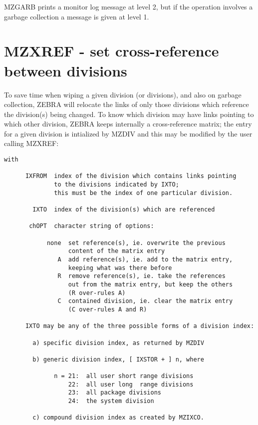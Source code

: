 MZGARB prints a monitor log message at level 2,
but if the operation involves a garbage collection
a message is given at level 1.

\section{MZXREF - set cross-reference between divisions}

To save time when wiping a given division (or divisions),
and also on garbage collection,
ZEBRA will relocate the links of only those divisions
which reference the division(s) being changed.
To know which division may have links pointing
to which other division,
ZEBRA keeps internally a cross-reference matrix;
the entry for a given division is intialized by MZDIV
and this may be modified by the user calling MZXREF:

\begin{verbatim}
with

      IXFROM  index of the division which contains links pointing
              to the divisions indicated by IXTO;
              this must be the index of one particular division.

        IXTO  index of the division(s) which are referenced

       chOPT  character string of options:

            none  set reference(s), ie. overwrite the previous
                  content of the matrix entry
               A  add reference(s), ie. add to the matrix entry,
                  keeping what was there before
               R  remove reference(s), ie. take the references
                  out from the matrix entry, but keep the others
                  (R over-rules A)
               C  contained division, ie. clear the matrix entry
                  (C over-rules A and R)

      IXTO may be any of the three possible forms of a division index:

        a) specific division index, as returned by MZDIV

        b) generic division index, [ IXSTOR + ] n, where

              n = 21:  all user short range divisions
                  22:  all user long  range divisions
                  23:  all package divisions
                  24:  the system division

        c) compound division index as created by MZIXCO.
\end{verbatim} 


